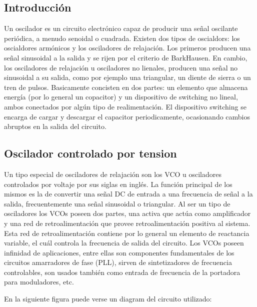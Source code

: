 


\subsection{Introducción}

Un oscilador es un circuito electrónico capaz de producir una señal oscilante periódica, a menudo senoidal o cuadrada. Existen dos tipos de oscialdors: los oscialdores armónicos y los osciladores de relajación. Los primeros producen una señal sinusoidal a la salida y se rijen por el criterio de BarkHausen. En cambio, los osciladores de relajación u osciladores no lienales, producen una señal no sinusoidal a su salida, como por ejemplo una triangular, un diente de sierra o un tren de pulsos. Basicamente concisten en dos partes: un elemento que almacena energía (por lo general un copacitor) y un dispositivo de switching no lineal, ambos conectados por algún tipo de realimentación. El dispositivo switching se encarga de cargar y descargar el capacitor periodicamente, ocasionando cambios abruptos en la salida del circuito. 


\subsection{Oscilador controlado por tension}

Un tipo especial de osciladores de relajación son los VCO u osciladores controlados por voltaje por sus siglas en inglés. La función principal de los mismos es la de convertir una señal DC de entrada a una frecuencia de señal a la salida, frecuentemente una señal sinusoidal o triangular. Al ser un tipo de osciladores los VCOs poseen dos partes, una activa que actúa como amplificador y una red de retroalimentación que provee retroalimentación positiva al sistema. Esta red de retroalimentación contiene por lo general un elemento de reactancia variable, el cuál controla la frecuencia de salida del circuito. 
Los VCOs poseen infinidad de aplicaciones, entre ellas son componentes fundamentales de los circuitos amarradores de fase (PLL), sirven de sintetizadores de frecuencia controlables, son usados también como entrada de frecuencia de la portadora para moduladores, etc.

En la siguiente figura puede verse un diagram del circuito utilizado:

